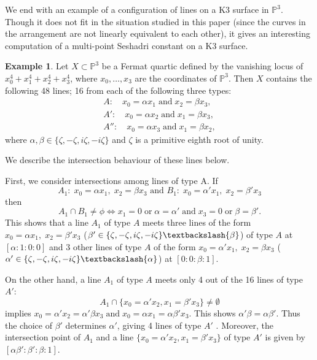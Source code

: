 \documentclass[12pt,reqno]{amsart}
\theoremstyle{plain}
\numberwithin{equation}{section}
\theoremstyle{definition}
\newtheorem{example}[theorem]{Example}
\begin{document}
We end with an example of a configuration of lines on a K3 surface in $\mathbb{P}^3$. Though it does
not fit in the situation studied in this paper (since the curves in the arrangement are not
linearly equivalent to each other), it gives an interesting computation of a multi-point Seshadri
constant on a K3 surface.

\begin{example}
		Let $X \subset \mathbb{P}^3$ be a Fermat quartic defined by the vanishing locus of $x_0^4 + x_1^4 + x_2^4 + x_3^4$, where $x_0, \ldots, x_3$ are the coordinates of $\mathbb{P}^3$. Then $X$ contains the following 48 lines; 16 from each of the following three types: 
		\begin{eqnarray*}
			A: \quad x_0 = \alpha x_1 \; \text{and} \; x_2 = \beta x_3, \\
			A': \quad x_0 = \alpha x_2 \; \text{and} \; x_1 = \beta x_3, \\
			A'': \quad x_0 = \alpha x_3 \; \text{and} \; x_1 = \beta x_2,
		\end{eqnarray*}
		where $\alpha, \beta \in \{\zeta, -\zeta, i\zeta, -i\zeta \}$ and $\zeta$ is a primitive eighth root of unity. 
		
		We describe the intersection behaviour of these lines 
		below. 
		
		First, we consider intersections among lines of type A. 
		If $$A_1: \; x_0 = \alpha x_1, \;  x_2 = \beta x_3 \text{ and } B_1: \; x_0 = \alpha' x_1, \; x_2 = \beta' x_3$$ then 
		\[
		A_1 \cap B_1 \neq \phi \Leftrightarrow x_1 = 0 \;  \text{or} \;  \alpha = \alpha' \; \text{and} \; x_3 = 0\;  \text{or} \; \beta = \beta'.
		\]
		This shows that a line $A_1$ of type $A$ meets three lines of the form  $x_0 = \alpha x_1,\; x_2 = \beta' x_3$ ($\beta' \in \{\zeta, -\zeta, i\zeta, -i\zeta \} \textbackslash \{\beta\}$) of type $A$ at $[\alpha :1 :0 :0]$ and 3 other lines of type $A$ of the form $x_0 = \alpha' x_1,\; x_2 = \beta x_3$ ($\alpha' \in \{\zeta, -\zeta, i\zeta, -i\zeta \} \textbackslash \{\alpha\}$) at $[0 :0 :\beta :1]$. 
		
		On the other hand, a line $A_1$ of type $A$ meets only 4 out of the 16 lines of type $A'$: 
		\[
		A_1 \cap \{x_0 = \alpha' x_2, x_1 = \beta' x_3\} \ne \emptyset
		\]
implies
			$x_0 = \alpha' x_2 = \alpha'  \beta x_3 \; \text{and} \; x_0 = \alpha x_1 = \alpha \beta' x_3$. This shows  
			$\alpha'  \beta = \alpha \beta'$. Thus the choice of $\beta'$ determines $\alpha'$, giving 4 lines of type $A'$ . Moreover, the intersection point of $A_1$ and a line $\{x_0 = \alpha' x_2, x_1 = \beta' x_3\}$ of type $A'$ 
			is given by $[\alpha \beta'  : \beta' : \beta : 1]$. 
			

\end{example}
\end{document}

